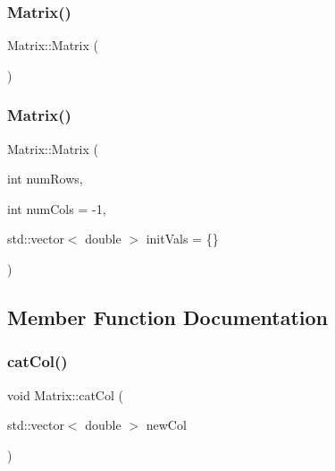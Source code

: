 \subsubsection{\texorpdfstring{Matrix()}{Matrix()}\hspace{0.1cm}{\footnotesize\ttfamily [1/2]}}
{\footnotesize\ttfamily Matrix\+::\+Matrix (\begin{DoxyParamCaption}{ }\end{DoxyParamCaption})}

\mbox{\label{class_matrix_a4b4b9ae88079c441a7acc781fdbaa032}} 
\subsubsection{\texorpdfstring{Matrix()}{Matrix()}\hspace{0.1cm}{\footnotesize\ttfamily [2/2]}}
{\footnotesize\ttfamily Matrix\+::\+Matrix (\begin{DoxyParamCaption}\item[{int}]{num\+Rows,  }\item[{int}]{num\+Cols = {\ttfamily -\/1},  }\item[{std\+::vector$<$ double $>$}]{init\+Vals = {\ttfamily \{\}} }\end{DoxyParamCaption})}



\subsection{Member Function Documentation}
\mbox{\label{class_matrix_a1d288589b025eb2dad477b9699a79e9f}} 
\subsubsection{\texorpdfstring{cat\+Col()}{catCol()}}
{\footnotesize\ttfamily void Matrix\+::cat\+Col (\begin{DoxyParamCaption}\item[{std\+::vector$<$ double $>$}]{new\+Col }\end{DoxyParamCaption})}

\mbox{\label{class_matrix_a8e3776c15fa1abfd2ffcbd593098131f}} 
